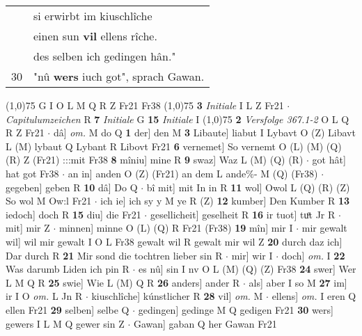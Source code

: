 \documentclass[8pt,a4paper,notitlepage]{article}
\begin{document}
\begin{table}[ht]
\begin{minipage}[t]{0.5\linewidth}
\begin{tabular}{rl}
 & si erwirbt im kiuschlîche\\ 
 & einen sun \textbf{vil} ellens rîche.\\ 
 & des selben ich gedingen hân."\\ 
30 & "nû \textbf{wers} iuch got", sprach Gawan.\\ 
\end{tabular}
\scriptsize
\line(1,0){75} \newline
G I O L M Q R Z Fr21 Fr38 \newline
\line(1,0){75} \newline
\textbf{3} \textit{Initiale} I L Z Fr21   $\cdot$ \textit{Capitulumzeichen} R  \textbf{7} \textit{Initiale} G  \textbf{15} \textit{Initiale} I  \newline
\line(1,0){75} \newline
\textbf{2} \textit{Versfolge 367.1-2} O L Q R Z Fr21   $\cdot$ dâ] \textit{om.} M do Q \textbf{1} der] den M \textbf{3} Libaute] liabut I Lybavt O (Z) Libavt L (M) lybaut Q Lybant R Libovt Fr21 \textbf{6} vernemet] So vernemt O (L) (M) (Q) (R) Z (Fr21) :::mit Fr38 \textbf{8} mîniu] mine R \textbf{9} swaz] Waz L (M) (Q) (R)  $\cdot$ got hât] hat got Fr38  $\cdot$ an in] anden O (Z) (Fr21) an dem L ande\%- M (Q) (Fr38)  $\cdot$ gegeben] geben R \textbf{10} dâ] Do Q  $\cdot$ bî mit] mit In in R \textbf{11} wol] Owol L (Q) (R) (Z) So wol M Ow:l Fr21  $\cdot$ ich ie] ich sy y M ye R (Z) \textbf{12} kumber] Den Kumber R \textbf{13} iedoch] doch R \textbf{15} diu] die Fr21  $\cdot$ gesellicheit] geselheit R \textbf{16} ir tuot] tuͦt Jr R  $\cdot$ mit] mir Z  $\cdot$ minnen] minne O (L) (Q) R Fr21 (Fr38) \textbf{19} mîn] mir I  $\cdot$ mir gewalt wil] wil mir gewalt I O L Fr38 gewalt wil R gewalt mir wil Z \textbf{20} durch daz ich] Dar durch R \textbf{21} Mir sond die tochtren lieber sin R  $\cdot$ mir] wir I  $\cdot$ doch] \textit{om.} I \textbf{22} Was darumb Liden ich pin R  $\cdot$ es nû] sin I nv O L (M) (Q) (Z) Fr38 \textbf{24} swer] Wer L M Q R \textbf{25} swie] Wie L (M) Q R \textbf{26} anders] ander R  $\cdot$ als] aber I so M \textbf{27} im] ir I O \textit{om.} L Jn R  $\cdot$ kiuschlîche] kúnstlicher R \textbf{28} vil] \textit{om.} M  $\cdot$ ellens] \textit{om.} I eren Q ellen Fr21 \textbf{29} selben] selbe Q  $\cdot$ gedingen] gedinge M Q gedigen Fr21 \textbf{30} wers] gewers I L M Q gewer sin Z  $\cdot$ Gawan] gaban Q her Gawan Fr21 \newline
\end{minipage}
\hspace{0.5cm}
\begin{minipage}[t]{0.5\linewidth}

\end{minipage}
\end{table}
\end{document}

